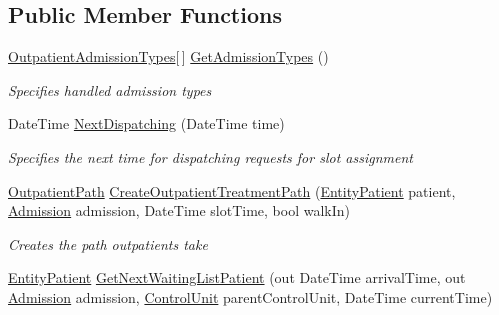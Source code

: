 \subsection*{Public Member Functions}
\begin{DoxyCompactItemize}
\item 
\hyperlink{class_general_health_care_elements_1_1_treatment_admission_types_1_1_outpatient_admission_types}{Outpatient\+Admission\+Types}\mbox{[}$\,$\mbox{]} \hyperlink{interface_general_health_care_elements_1_1_department_models_1_1_outpatient_1_1_i_input_outpatient_a4fb88af8458289d2fae781679a5e4813}{Get\+Admission\+Types} ()
\begin{DoxyCompactList}\small\item\em Specifies handled admission types \end{DoxyCompactList}\item 
Date\+Time \hyperlink{interface_general_health_care_elements_1_1_department_models_1_1_outpatient_1_1_i_input_outpatient_ab18ee0a2d14360da569e968e79fdebcf}{Next\+Dispatching} (Date\+Time time)
\begin{DoxyCompactList}\small\item\em Specifies the next time for dispatching requests for slot assignment \end{DoxyCompactList}\item 
\hyperlink{class_general_health_care_elements_1_1_department_models_1_1_outpatient_1_1_outpatient_path}{Outpatient\+Path} \hyperlink{interface_general_health_care_elements_1_1_department_models_1_1_outpatient_1_1_i_input_outpatient_aeaf667aa81244ec83606ae5fc38f2afa}{Create\+Outpatient\+Treatment\+Path} (\hyperlink{class_general_health_care_elements_1_1_entities_1_1_entity_patient}{Entity\+Patient} patient, \hyperlink{class_general_health_care_elements_1_1_treatment_admission_types_1_1_admission}{Admission} admission, Date\+Time slot\+Time, bool walk\+In)
\begin{DoxyCompactList}\small\item\em Creates the path outpatients take \end{DoxyCompactList}\item 
\hyperlink{class_general_health_care_elements_1_1_entities_1_1_entity_patient}{Entity\+Patient} \hyperlink{interface_general_health_care_elements_1_1_department_models_1_1_outpatient_1_1_i_input_outpatient_a4dc555fbcef7ccc134172ec675e22ff8}{Get\+Next\+Waiting\+List\+Patient} (out Date\+Time arrival\+Time, out \hyperlink{class_general_health_care_elements_1_1_treatment_admission_types_1_1_admission}{Admission} admission, \hyperlink{class_simulation_core_1_1_h_c_c_m_elements_1_1_control_unit}{Control\+Unit} parent\+Control\+Unit, Date\+Time current\+Time)

\end{DoxyCompactItemize}
